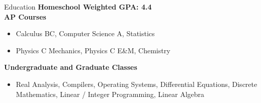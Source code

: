 \documentclass[10pt]{resume}
\newenvironment{rlist}{
  \begin{itemize}{\leftmargin=0em}
  \itemsep -0.5em \vspace{-0.5em}
  }{\end{itemize}}
\begin{document}
\begin{rSection}{Education}
    \textbf{Homeschool Weighted GPA: 4.4} \\
    \textbf{AP Courses}
    \begin{rlist}
        \item Calculus BC, Computer Science A, Statistics
        \item Physics C Mechanics, Physics C E\&M, Chemistry
    \end{rlist}
    \textbf{Undergraduate and Graduate Classes}
    \begin{rlist}
        \item Real Analysis, Compilers, Operating Systems, Differential
            Equations, Discrete Mathematics, Linear / Integer Programming,
            Linear Algebra 
    \end{rlist}
\end{rSection}
\end{document}
